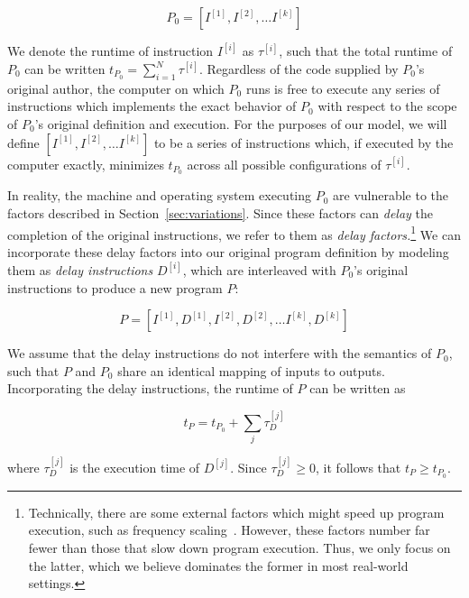 \documentclass[conference]{IEEEtran}
\begin{document}
\begin{equation}
    P_0 = \left[I^{[1]}, I^{[2]}, \dots I^{[k]}\right]
\end{equation}

We denote the runtime of instruction $I^{[i]}$ as $\tau^{[i]}$, such that the total runtime
of $P_0$ can be written $t_{P_0} = \sum_{i=1}^N \tau^{[i]}$. Regardless of the code supplied
by $P_0$'s original author, the computer on which $P_0$ runs is free to execute any series
of instructions which implements the exact behavior of $P_0$ with respect to the scope of
$P_0$'s original definition and execution. For the purposes of our model, we will define
$\left[I^{[1]}, I^{[2]}, \dots I^{[k]}\right]$ to be a series of instructions which, if
executed by the computer exactly, minimizes $t_{P_0}$ across all possible configurations of
$\tau^{[i]}$.

In reality, the machine and operating system executing $P_0$ are vulnerable to the factors
described in Section~\ref{sec:variations}. Since these factors can \textit{delay} the
completion of the original instructions, we refer to them as \textit{delay
factors.}\footnote{Technically, there are some external factors which might speed up program
execution, such as frequency scaling~\cite{RHEL6}. However, these factors number far fewer
than those that slow down program execution. Thus, we only focus on the latter, which we
believe dominates the former in most real-world settings.} We can incorporate these delay
factors into our original program definition by modeling them as \textit{delay instructions}
$D^{[i]}$, which are interleaved with $P_0$'s original instructions to produce a new program
$P$:

\begin{equation}
    P = \left[I^{[1]}, D^{[1]}, I^{[2]}, D^{[2]}, \dots I^{[k]}, D^{[k]}\right]
\end{equation}

We assume that the delay instructions do not interfere with the semantics of $P_0$, such
that $P$ and $P_0$ share an identical mapping of inputs to outputs. Incorporating the delay
instructions, the runtime of $P$ can be written as

\begin{equation}
    t_P = t_{P_0} + \sum_{j} \tau^{[j]}_D
\end{equation}

where $\tau^{[j]}_D$ is the execution time of $D^{[j]}$. Since $\tau^{[j]}_D \ge 0$, it
follows that $t_P \ge t_{P_0}$.
\end{document}
